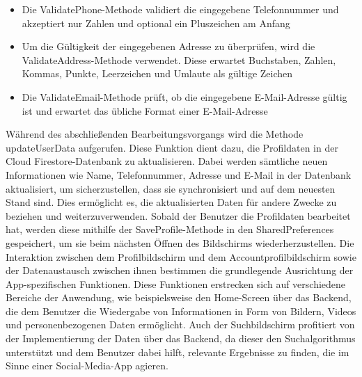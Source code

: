 \begin{itemize}[itemsep=0pt]
    \item{Die ValidatePhone-Methode validiert die eingegebene Telefonnummer und akzeptiert nur Zahlen und optional ein Pluszeichen am Anfang}
\end{itemize}
\begin{itemize}[itemsep=0pt]
    \item{Um die Gültigkeit der eingegebenen Adresse zu überprüfen, wird die ValidateAddress-Methode verwendet. Diese erwartet Buchstaben, Zahlen, Kommas, Punkte, Leerzeichen und Umlaute als gültige Zeichen} 
\end{itemize}
\begin{itemize}[itemsep=0pt]
	\item{Die ValidateEmail-Methode prüft, ob die eingegebene E-Mail-Adresse gültig ist und erwartet das übliche Format einer E-Mail-Adresse}
\end{itemize}
Während des abschließenden Bearbeitungsvorgangs wird die Methode updateUserData aufgerufen. Diese Funktion dient dazu, die Profildaten in der Cloud Firestore-Datenbank zu aktualisieren. Dabei werden sämtliche neuen Informationen wie Name, Telefonnummer, Adresse und E-Mail in der Datenbank aktualisiert, um sicherzustellen, dass sie synchronisiert und auf dem neuesten Stand sind. Dies ermöglicht es, die aktualisierten Daten für andere Zwecke zu beziehen und weiterzuverwenden. Sobald der Benutzer die Profildaten bearbeitet hat, werden diese mithilfe der SaveProfile-Methode in den SharedPreferences gespeichert, um sie beim nächsten Öffnen des Bildschirms wiederherzustellen.  Die Interaktion zwischen dem Profilbildschirm und dem Accountprofilbildschirm sowie der Datenaustausch zwischen ihnen bestimmen die grundlegende Ausrichtung der App-spezifischen Funktionen. Diese Funktionen erstrecken sich auf verschiedene Bereiche der Anwendung, wie beispielsweise den Home-Screen über das Backend, die dem Benutzer die Wiedergabe von Informationen in Form von Bildern, Videos und personenbezogenen Daten ermöglicht. Auch der Suchbildschirm profitiert von der Implementierung der Daten über das Backend, da dieser den Suchalgorithmus unterstützt und dem Benutzer dabei hilft, relevante Ergebnisse zu finden, die im Sinne einer Social-Media-App agieren.


